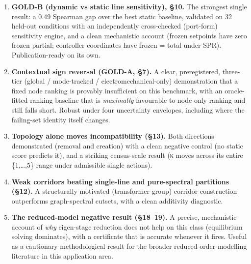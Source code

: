 \documentclass[10pt,a4paper]{article}
\begin{document}
\begin{enumerate}
\item \textbf{GOLD-B (dynamic vs static line sensitivity), §10.} The strongest single result: a 0.49 Spearman gap over the best static baseline, validated on 32 held-out conditions with an independently cross-checked (port-form) sensitivity engine, and a clean mechanistic account (frozen setpoints have zero frozen partial; controller coordinates have frozen = total under SPR). Publication-ready on its own.
\item \textbf{Contextual sign reversal (GOLD-A, §7).} A clear, preregistered, three-tier (global / mode-tracked / electromechanical-only) demonstration that a fixed node ranking is provably insufficient on this benchmark, with an oracle-fitted ranking baseline that is \emph{maximally} favourable to node-only ranking and still falls short. Robust under four uncertainty envelopes, including where the failing-set identity itself changes.
\item \textbf{Topology alone moves incompatibility (§13).} Both directions demonstrated (removal and creation) with a clean negative control (no static score predicts it), and a striking census-scale result (κ moves across its entire \{1,…,5\} range under admissible single actions).
\item \textbf{Weak corridors beating single-line and pure-spectral partitions (§12).} A structurally motivated (transformer-group) corridor construction outperforms graph-spectral cutsets, with a clean additivity diagnostic.
\item \textbf{The reduced-model negative result (§18–19).} A precise, mechanistic account of \emph{why} eigen-stage reduction does not help on this class (equilibrium solving dominates), with a certificate that is accurate whenever it fires. Useful as a cautionary methodological result for the broader reduced-order-modelling literature in this application area.
\end{enumerate}
\end{document}
